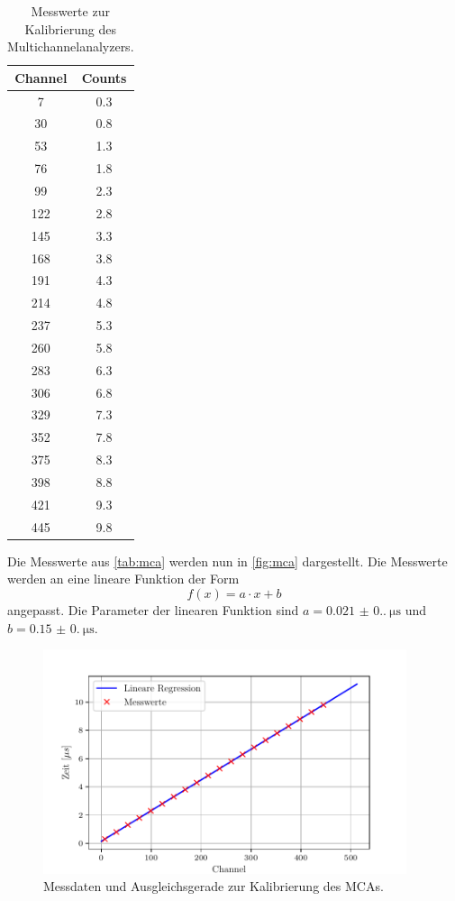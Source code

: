 \begin{table}[H]
  \centering
  \caption{Messwerte zur Kalibrierung des Multichannelanalyzers.}
  \label{tab:mca}
  \begin{tabular}{c|c}
    \hline
    \textbf{Channel} & \textbf{Counts} \\
    \hline
    7 & 0.3\\
    30 & 0.8\\
    53 & 1.3\\
    76 & 1.8\\
    99 & 2.3\\
    122 & 2.8\\
    145 & 3.3\\
    168 & 3.8\\
    191 & 4.3\\
    214 & 4.8\\
    237 & 5.3\\
    260 & 5.8\\
    283 & 6.3\\
    306 & 6.8\\
    329 & 7.3\\
    352 & 7.8\\
    375 & 8.3\\
    398 & 8.8\\
    421 & 9.3\\
    445 & 9.8
  \end{tabular}
\end{table}

Die Messwerte aus \autoref{tab:mca} werden nun in \autoref{fig:mca} dargestellt. Die Messwerte werden an eine lineare Funktion der Form
\begin{equation*}
  f(x) = a \cdot x + b
\end{equation*}
angepasst. Die Parameter der linearen Funktion sind $a = \SI{0.021(0.00)}{\micro\s}$ und $b = \SI{0.15(0.00)}{\micro\s}$.

\begin{figure}[H]
  \centering
  \includegraphics[width=0.95\textwidth]{build/mca.pdf}
  \caption{Messdaten und Ausgleichsgerade zur Kalibrierung des MCAs.}
  \label{fig:mca}
\end{figure}

